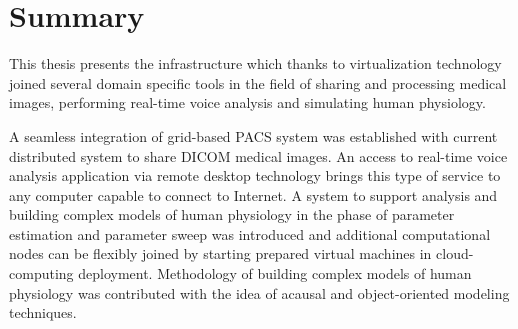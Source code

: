 \section{Summary}

This thesis presents the infrastructure which thanks to virtualization technology joined several domain specific tools in the field of sharing and processing medical images, performing real-time voice analysis and simulating human physiology.  

A seamless integration of grid-based PACS system was established with current distributed system to share DICOM medical images. An access to real-time voice analysis application via remote desktop technology brings this type of service to any computer capable to connect to Internet. A system to support analysis and building complex models of human physiology in the phase of parameter estimation and parameter sweep was introduced and additional computational nodes can be flexibly joined by starting prepared virtual machines in cloud-computing deployment. Methodology of building complex models of human physiology was contributed with the idea of acausal and object-oriented modeling techniques.
